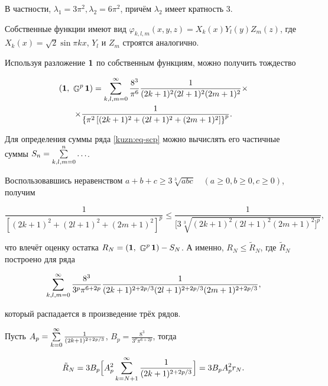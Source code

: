     В частности, $\lambda_1=3\pi^2, \lambda_2=6\pi^2$, причём $\lambda_2$ имеет кратность $3$.



    Собственные функции имеют вид $\varphi_{k,l,m}(x, y, z)=X_k(x)Y_l(y)Z_m(z)$, где $X_k(x)=\sqrt{2}\sin\pi kx$, $Y_l$ и $Z_m$ строятся аналогично.



    Используя разложение $\mathbf{1}$ по собственным функциям, можно получить тождество

\begin{multline}\label{kuzn:eq-scp}

\scp{\One}{\IGreen^p\One}=\lsum_{k, l, m=0}^\infty\frac{8^3}{\pi^6}\frac{1}{(2k+1)^2(2l+1)^2(2m+1)^2}\times

\\

\times\frac{1}{\left\lbrace\pi^2\left[(2k+1)^2+(2l+1)^2+(2m+1)^2\right]\right\rbrace^p}.

\end{multline}

Для определения суммы ряда \eqref{kuzn:eq-scp} можно вычислять его частичные суммы $S_n=\sum\limits_{k,l,m=0}^n\ldots$.



    Воспользовавшись неравенством $a+b+c\geqslant 3\sqrt[3]{abc}\quad(a\geqslant0, b\geqslant 0, c\geqslant0)$, получим

    \[

        \frac{1}{[(2k+1)^2+(2l+1)^2+(2m+1)^2]^p}\leqslant\frac{1}{[3\sqrt[3]{(2k+1)^2(2l+1)^2(2m+1)^2]^p}},

    \]

    что влечёт оценку остатка $R_N=\left({\mathbf{1}},\ {\mathop{\mathbb{G}}\nolimits^p\mathbf{1}}\right)-S_N$. А именно, $R_N\leqslant\tilde R_N$, где $\tilde R_N$ построено для ряда

    \[

        \lsum_{k,l,m=0}^\infty\frac{8^3}{3^p\pi^{6+2p}}\frac{1}{(2k+1)^{2+2p/3}(2l+1)^{2+2p/3}(2m+1)^{2+2p/3}},

    \]

    который распадается в произведение трёх рядов.



    Пусть $A_p=\sum\limits_{k=0}^\infty\frac{1}{(2k+1)^{2+2p/3}}$, $B_p=\frac{8^3}{3^p\pi^{6+2p}}$, тогда

    \[

        \tilde R_N=3B_p\Bigl[A^2_p\lsum_{k=N+1}^\infty\frac{1}{(2k+1)^{2+2p/3}}\Bigr]=3B_pA^2_pr_N.

    \]



